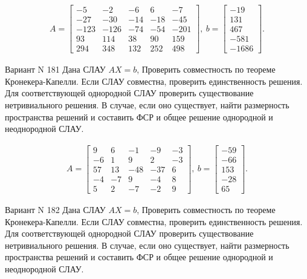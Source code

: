 \documentclass[11pt]{report}
\begin{document}
\begin{align*}
 A = \left[\begin{matrix}-5 & -2 & -6 & 6 & -7\\-27 & -30 & -14 & -18 & -45\\-123 & -126 & -74 & -54 & -201\\93 & 114 & 38 & 90 & 159\\294 & 348 & 132 & 252 & 498\end{matrix}\right],
\ b = \left[\begin{matrix}-19\\131\\467\\-581\\-1686\end{matrix}\right]. 
 \end{align*}

Вариант N 181
Дана СЛАУ $AX = b$,
Проверить совместность по теореме Кронекера-Капелли. Если СЛАУ совместна, проверить единственность решения.
Для соответствующей однородной СЛАУ проверить существование нетривиального решения. В случае, если оно существует,
найти размерность пространства решений и составить ФСР и общее решение однородной  и неоднородной СЛАУ.


\begin{align*}
 A = \left[\begin{matrix}9 & 6 & -1 & -9 & -3\\-6 & 1 & 9 & 2 & -3\\57 & 13 & -48 & -37 & 6\\-4 & -7 & 9 & -4 & 8\\5 & 2 & -7 & -2 & 9\end{matrix}\right],
\ b = \left[\begin{matrix}-59\\-66\\153\\-28\\65\end{matrix}\right]. 
 \end{align*}

Вариант N 182
Дана СЛАУ $AX = b$,
Проверить совместность по теореме Кронекера-Капелли. Если СЛАУ совместна, проверить единственность решения.
Для соответствующей однородной СЛАУ проверить существование нетривиального решения. В случае, если оно существует,
найти размерность пространства решений и составить ФСР и общее решение однородной  и неоднородной СЛАУ.
\end{document}
